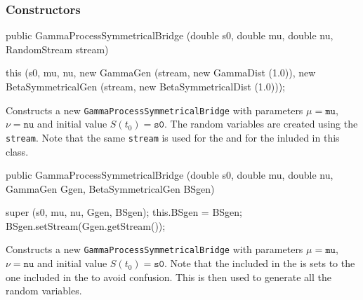 \subsubsection* {Constructors}
\begin{code}

   public GammaProcessSymmetricalBridge (double s0, double mu, double nu,
                                         RandomStream stream) \begin{hide} {
        this (s0, mu, nu, new GammaGen (stream, new GammaDist (1.0)),
              new BetaSymmetricalGen (stream, new BetaSymmetricalDist (1.0)));
    }\end{hide}
\end{code}
\begin{tabb} Constructs a new \texttt{GammaProcessSymmetricalBridge}
with parameters $\mu = \texttt{mu}$, $\nu = \texttt{nu}$ and initial
value $S(t_{0}) = \texttt{s0}$.
The random variables are created using the
 \texttt{stream}.
Note that the same 
\texttt{stream} is used for the
 and for the
inluded in this class.
\end{tabb}
\begin{code}

   public GammaProcessSymmetricalBridge (double s0, double mu, double nu,
                                         GammaGen Ggen,
                                         BetaSymmetricalGen BSgen) \begin{hide} {
        super (s0, mu, nu, Ggen, BSgen);
        this.BSgen = BSgen;
        BSgen.setStream(Ggen.getStream());
    }\end{hide}
\end{code}
\begin{tabb} Constructs a new \texttt{GammaProcessSymmetricalBridge}
with parameters $\mu = \texttt{mu}$, $\nu = \texttt{nu}$ and initial
value $S(t_{0}) = \texttt{s0}$.  Note that the
 included in
the 
is sets to the one included in the
 to avoid confusion.
This  is then used to
generate all the random variables.
\end{tabb}
